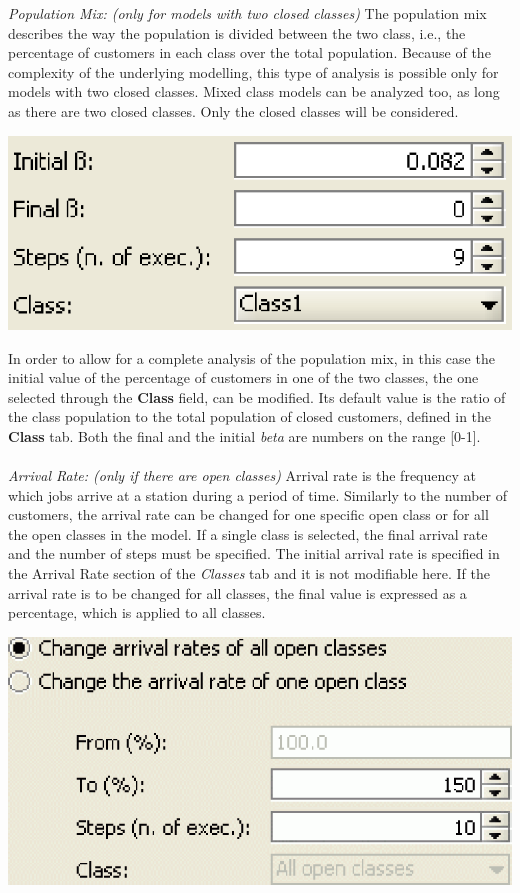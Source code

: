 \textit{Population Mix: (only for models with two closed classes)}
The population mix describes the way the population is divided
between the two class, i.e., the percentage of customers in each
class over the total population. Because of the complexity of the
underlying modelling, this type of analysis is possible only for
models with two closed classes. Mixed class models can be analyzed
too, as long as there are two closed classes. Only the closed
classes will be considered.
\begin{center}
\includegraphics[scale=.5]{img/jsim/popmix.eps}
\end{center}
In order to allow for a complete analysis of the population mix, in this case the initial value of the percentage of customers in one of the two classes, the one selected through the \textbf{Class} field, can be modified. Its default value is the ratio of the class population to the total population of closed customers, defined in the \textbf{Class} tab. Both the final and the initial \emph{beta} are numbers on the range [0-1].\\\\
\textit{Arrival Rate: (only if there are open classes)}
Arrival rate is the frequency at which jobs arrive at a station during a period of time.
Similarly to the number of customers, the arrival rate can be changed for one specific open class or for all the open classes in the model. If a single class is selected, the final arrival rate and the number of steps must be specified. The initial arrival rate is specified in the Arrival Rate section of the \textit{Classes} tab and it is not modifiable here.
If the arrival rate is to be changed for all classes, the final value is expressed as a percentage, which is applied to all classes.
\begin{center}
\includegraphics[scale=.5]{img/jsim/ex1.eps}
\end{center}
